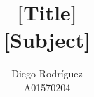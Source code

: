 \documentclass{article}
\title{\huge \textbf{[Title]}\\
\Large{[Subject]}}
\author{Diego Rodríguez\\A01570204}
\begin{document}
\let\oldhat\hat
\newcommand{\vect}[1]{\dot{\vec{#1}}}
\newcommand{\vectt}[1]{\ddot{\vec{#1}}}
\newcommand{\vecttt}[1]{\dddot{\vec{#1}}}
\renewcommand{\vec}[1]{\bm{#1}}
\renewcommand{\hat}[1]{\oldhat{\bm{#1}}}
\newcommand{\qed}{\blacksquare}
\newcommand{\norm}[1]{\left|#1\right|}
\newcommand{\dev}[2]{\frac{d#1}{d#2}}
\newcommand{\devp}[2]{\frac{\partial#1}{\partial#2}}
\newcommand{\rot}[1]{\nabla\times#1}
\newcommand{\e}{\hat{\textbf{e}}}
\newcommand{\ihat}{\bm{\hat{\imath}}}
\newcommand{\jhat}{\bm{\hat{\jmath}}}
\maketitle
\noindent
\end{document}
